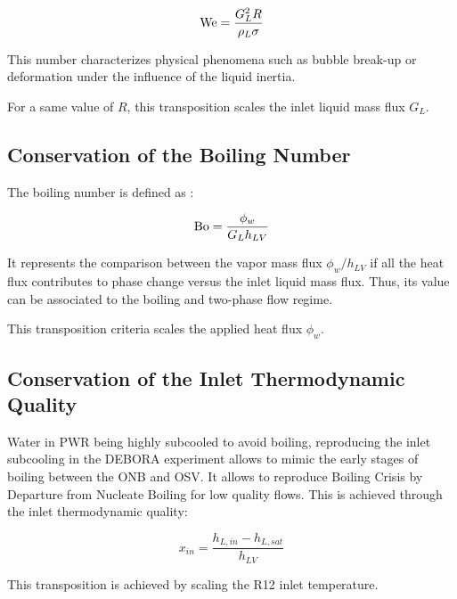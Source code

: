 \begin{equation}
\mathrm{We} = \dfrac{G_{L}^{2}R}{\rho_{L} \sigma}
\end{equation}

This number characterizes physical phenomena such as bubble break-up or deformation under the influence of the liquid inertia.

\npar

\begin{note*}{}
For a same value of $R$, this transposition scales the inlet liquid mass flux $G_{L}$.
\end{note*}

\subsection{Conservation of the Boiling Number}

The boiling number is defined as :

\begin{equation}
\mathrm{Bo} = \frac{\phi_{w}}{G_{L}h_{LV}}
\end{equation}  

It represents the comparison between the vapor mass flux $\phi_{w}/h_{LV}$ if all the heat flux contributes to phase change versus the inlet liquid mass flux. Thus, its value can be associated to the boiling and two-phase flow regime.

\begin{note*}{}
This transposition criteria scales the applied heat flux $\phi_{w}$.
\end{note*}

\subsection{Conservation of the Inlet Thermodynamic Quality}

Water in PWR being highly subcooled to avoid boiling, reproducing the inlet subcooling in the DEBORA experiment allows to mimic the early stages of boiling between the ONB and OSV. It allows to reproduce Boiling Crisis by Departure from Nucleate Boiling for low quality flows. This is achieved through the inlet thermodynamic quality:


\begin{equation}
x_{in} = \frac{h_{L,in} - h_{L,sat}}{h_{LV}}
\end{equation}

\begin{note*}{}
This transposition is achieved by scaling the R12 inlet temperature.
\end{note*}


